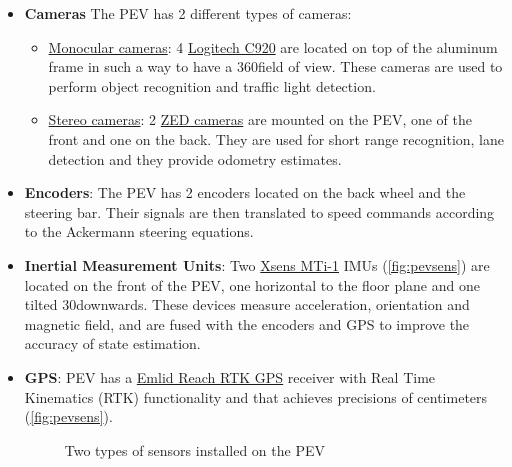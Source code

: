 \begin{itemize}
  \item \textbf{Cameras} The PEV has 2 different types of cameras:
  \begin{itemize}
    \item \underline{Monocular cameras}: 4 \href{https://www.logitech.com/en-us/product/hd-pro-webcam-c920}{Logitech C920} are located on top of the aluminum frame in such a way to have a 360\textdegree field of view. These cameras are used to perform object recognition and traffic light detection.

    \item \underline{Stereo cameras}: 2 \href{https://www.stereolabs.com/}{ZED cameras} are mounted on the PEV, one of the front and one on the back. They are used for short range recognition, lane detection and they provide odometry estimates.
  \end{itemize} 

  \item \textbf{Encoders}: The PEV has 2 encoders located on the back wheel and the steering bar. Their signals are then translated to speed commands according to the Ackermann steering equations.

  \item \textbf{Inertial Measurement Units}: Two \href{https://www.xsens.com/products/mti-1-series/}{Xsens MTi-1} IMUs (\autoref{fig:pevsens}\protect{}) are located on the front of the PEV, one horizontal to the floor plane and one tilted 30\textdegree downwards. These devices measure acceleration, orientation and magnetic field, and are fused with the encoders and GPS to improve the accuracy of state estimation.   

  \item \textbf{GPS}: PEV has a \href{https://docs.emlid.com/reach/}{Emlid Reach RTK GPS} receiver with Real Time Kinematics (RTK) functionality and that achieves precisions of centimeters (\autoref{fig:pevsens}\protect{}).

  \begin{figure}[h]
    \centering
     \qquad
    \caption{Two types of sensors installed on the PEV}
    \label{fig:pevsens}
  \end{figure}
\end{itemize}

